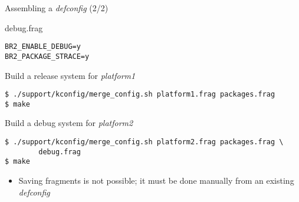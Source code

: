 \begin{frame}[fragile]{Assembling a {\em defconfig} (2/2)}

  \begin{block}{debug.frag}
    {\scriptsize
\begin{verbatim}
BR2_ENABLE_DEBUG=y
BR2_PACKAGE_STRACE=y
\end{verbatim}
    }
  \end{block}

  \begin{block}{Build a release system for {\em platform1}}
    {\scriptsize
\begin{verbatim}
$ ./support/kconfig/merge_config.sh platform1.frag packages.frag
$ make
\end{verbatim}
    }
  \end{block}

  \begin{block}{Build a debug system for {\em platform2}}
    {\scriptsize
\begin{verbatim}
$ ./support/kconfig/merge_config.sh platform2.frag packages.frag \
        debug.frag
$ make
\end{verbatim}
    }
  \end{block}

  \begin{itemize}
  \item Saving fragments is not possible; it must be done manually
    from an existing {\em defconfig}
  \end{itemize}

\end{frame}

